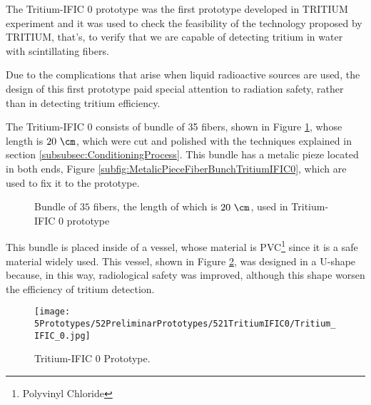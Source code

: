The Tritium-IFIC 0 prototype was the first prototype developed in TRITIUM experiment and it was used to check the feasibility of the technology proposed by TRITIUM, that's, to verify that we are capable of detecting tritium in water with scintillating fibers.

Due to the complications that arise when liquid radioactive sources are used, the design of this first prototype paid special attention to radiation safety, rather than in detecting tritium efficiency.

The Tritium-IFIC 0 consists of bundle of 35 fibers, shown in Figure \ref{fig:FiberBundleOfTritiumIFIC0}, whose length is $20~\cm$, which were cut and polished with the techniques explained in section \ref{subsubsec:ConditioningProcess}. This bundle has a metalic pieze located in both ends, Figure \ref{subfig:MetalicPieceFiberBunchTritiumIFIC0}, which are used to fix it to the prototype.

\begin{figure}[h]
 \centering
    \newline
 \caption{Bundle of $35$ fibers, the length of which is $20~\cm$, used in Tritium-IFIC 0 prototype}
 \label{fig:FiberBundleOfTritiumIFIC0}
\end{figure}

This bundle is placed inside of a vessel, whose material is PVC\footnote{Polyvinyl Chloride}  since it is a safe material widely used. This vessel, shown in Figure \ref{fig:TritiumIFIC0}, was designed in a U-shape because, in this way, radiological safety was improved, although this shape worsen the efficiency of tritium detection.

\begin{figure}[h]
\centering
\texttt{[image: 5Prototypes/52PreliminarPrototypes/521TritiumIFIC0/Tritium\_IFIC\_0.jpg]}
\caption{Tritium-IFIC 0 Prototype.\label{fig:TritiumIFIC0}}
\end{figure}

